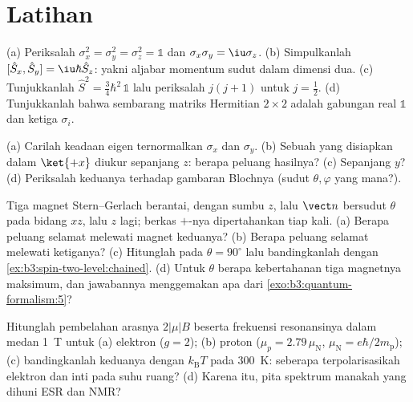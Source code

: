 \section{Latihan}

\begin{exercise}[$\star$]\label{exo:b3:spin-two-level:1}
(a) Periksalah $\sigma_x^2 = \sigma_y^2 = \sigma_z^2 = \mathbb 1$ dan
$\sigma_x\sigma_y = \iu\sigma_z$. (b) Simpulkanlah $[\hat S_x, \hat S_y]
= \iu\hbar\hat S_z$: yakni aljabar momentum sudut dalam dimensi dua.
(c) Tunjukkanlah $\hat S^2 = \tfrac34\hbar^2\,\mathbb 1$ lalu
periksalah $j(j+1)$ untuk $j = \tfrac12$. (d) Tunjukkanlah bahwa
sembarang matriks Hermitian $2\times2$ adalah gabungan real $\mathbb 1$
dan ketiga $\sigma_i$.
\end{exercise}

\begin{exercise}[$\star$]\label{exo:b3:spin-two-level:2}
(a) Carilah keadaan eigen ternormalkan $\sigma_x$ dan $\sigma_y$.
(b) Sebuah  yang disiapkan dalam $\ket{+x}$ diukur sepanjang $z$:
berapa peluang hasilnya? (c) Sepanjang $y$? (d) Periksalah keduanya
terhadap gambaran Blochnya (sudut $\theta, \varphi$ yang mana?).
\end{exercise}

\begin{exercise}[$\star$]\label{exo:b3:spin-two-level:3}
Tiga magnet Stern--Gerlach berantai, dengan sumbu $z$, lalu $\vect n$
bersudut $\theta$ pada bidang $xz$, lalu $z$ lagi; berkas $+$-nya
dipertahankan tiap kali. (a) Berapa peluang selamat melewati magnet
keduanya? (b) Berapa peluang selamat melewati ketiganya? (c) Hitunglah
pada $\theta = 90^\circ$ lalu bandingkanlah dengan
\cref{ex:b3:spin-two-level:chained}. (d) Untuk $\theta$ berapa
kebertahanan tiga magnetnya maksimum, dan jawabannya menggemakan apa
dari \cref{exo:b3:quantum-formalism:5}?
\end{exercise}

\begin{exercise}[$\star$]\label{exo:b3:spin-two-level:4}
Hitunglah pembelahan arasnya $2|\mu|B$ beserta frekuensi resonansinya
dalam medan \qty{1}{T} untuk (a) elektron ($g = 2$); (b)
proton ($\mu_p = 2.79\,\mu_{\text{N}}$, $\mu_{\text{N}} =
e\hbar/2m_{\text{p}}$); (c) bandingkanlah keduanya dengan
$k_{\text{B}}T$ pada \qty{300}{K}: seberapa terpolarisasikah 
elektron dan  inti pada suhu ruang? (d) Karena itu, pita spektrum
manakah yang dihuni ESR dan NMR?
\end{exercise}

